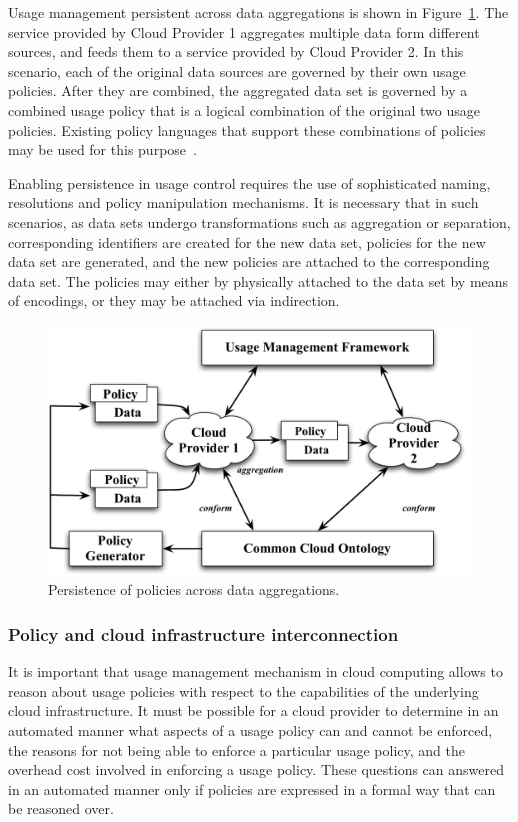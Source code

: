 \documentclass[10pt,letterpaper]{book}
\begin{document}
Usage management persistent across data aggregations is shown in Figure~\ref{fig:dynamics}. The service provided by Cloud Provider 1 aggregates multiple data form different sources, and feeds them to a service provided by Cloud Provider 2. In this scenario, each of the original data sources are governed by their own usage policies. After they are combined, the aggregated data set is governed by a combined usage policy that is a logical combination of the original two usage policies. Existing policy languages that support these combinations of policies may be used for this purpose~\cite{JaHe:08a}.

Enabling persistence in usage control requires the use of sophisticated naming, resolutions and policy manipulation mechanisms. It is necessary that in such scenarios, as data sets undergo transformations such as aggregation or separation, corresponding identifiers are created for the new data set, policies for the new data set are generated, and the new policies are attached to the corresponding data set. The policies may either by physically attached to the data set by means of encodings, or they may be attached via indirection. 

\begin{figure}[!t]
\centering
\includegraphics[scale=0.4]{dynamics}
\caption{Persistence of policies across data aggregations.}
\label{fig:dynamics}
\end{figure}

\subsubsection{Policy and cloud infrastructure interconnection}
It is important that usage management mechanism in cloud computing allows to reason about usage policies with respect to the capabilities of the underlying cloud infrastructure. It must be possible for a cloud provider to determine in an automated manner what aspects of a usage policy can and cannot be enforced, the reasons for not being able to enforce a particular usage policy, and the overhead cost involved in enforcing a usage policy. These questions can answered in an automated manner only if policies are expressed in a formal way that can be reasoned over. 
\end{document}
